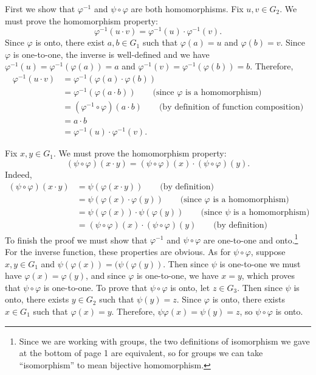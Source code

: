 \documentclass[12pt,reqno]{amsart}
\newcommand{\<}{\ensuremath{\langle}}
\renewcommand{\>}{\ensuremath{\rangle}}
\renewcommand{\phi}{\ensuremath{\varphi}}
\begin{document}
\begin{enumerate}[{\bf 1.}]
\medskip
{} First we show that $\phi^{-1}$ and $\psi\circ \phi$
are both homomorphisms.
Fix $u, v \in G_2$.  We must prove the homomorphism property:
\begin{equation}
  \label{eq:1}
\phi^{-1}(u \cdot v) = \phi^{-1}(u) \cdot \phi^{-1}(v).
\end{equation}
Since $\phi$ is onto, there exist $a, b\in G_1$ such that $\phi(a) = u$ and
$\phi(b) = v$.  Since $\phi$ is one-to-one, the inverse is well-defined and we
have $\phi^{-1}(u) = \phi^{-1}(\phi(a)) =a$ and 
$\phi^{-1}(v) = \phi^{-1}(\phi(b)) = b$.  Therefore,
\begin{align*}
\phi^{-1}(u  \cdot v) &= \phi^{-1}(\phi(a) \cdot  \phi(b))\\
&= \phi^{-1}(\phi(a \cdot  b)) \qquad \text{(since $\phi$ is a homomorphism)}\\
&= (\phi^{-1}\circ\phi)(a \cdot  b)\qquad \text{(by definition of function composition)}\\
&= a \cdot  b\\
&= \phi^{-1}(u) \cdot \phi^{-1}(v).
\end{align*}

Fix $x, y \in G_1$. We must prove the homomorphism property:
\begin{equation}
  \label{eq:2}
(\psi\circ \phi)(x\cdot y) =(\psi\circ \phi)(x)\cdot (\psi\circ \phi)(y).
\end{equation}
Indeed,
\begin{align*}
(\psi\circ \phi)(x\cdot y) &=\psi(\phi(x\cdot y)) \qquad \text{(by definition)}\\
&=\psi(\phi(x)\cdot \phi(y)) \qquad \text{(since $\phi$ is a homomorphism)}\\
&=\psi(\phi(x))\cdot \psi(\phi(y)) \qquad \text{(since $\psi$ is a homomorphism)}\\
&=(\psi\circ \phi)(x) \cdot (\psi\circ \phi)(y) \qquad \text{(by definition)}
\end{align*}
To finish the proof we must
show that $\phi^{-1}$ and $\psi\circ \phi$ 
are one-to-one and onto.\footnote{Since we are working with groups, the two
  definitions of isomorphism we gave at the bottom of page 1 are
  equivalent, so for groups we can take ``isomorphism'' to mean bijective
  homomorphism.} 
For the inverse function, these properties are obvious.  
As for $\psi \circ \phi$, suppose $x, y\in G_1$ and 
 $\psi(\phi (x)) =  (\psi(\phi(y))$. Then since $\psi$ is one-to-one we must
have $\phi(x)=\phi(y)$, and since $\phi$ is one-to-one, we have $x=y$, which
proves that $\psi\circ\phi$ is one-to-one.
To prove that $\psi\circ\phi$ is onto, let $z \in G_3$.  
Then since $\psi$ is onto, there exists $y\in G_2$ such that $\psi(y) = z$.
Since $\phi$ is onto, there exists $x\in G_1$ such that $\phi(x) = y$.
Therefore, $\psi\phi(x) = \psi(y) = z$, so 
$\psi\circ\phi$ is onto.


\end{enumerate}
\end{document}

